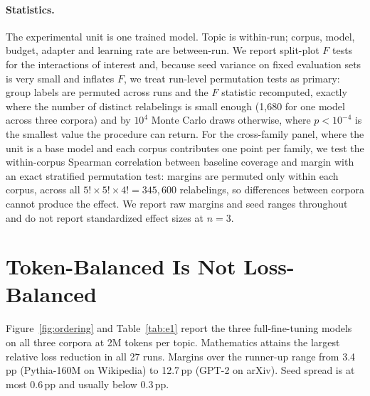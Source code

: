 \documentclass[11pt]{article}
\begin{document}
\paragraph{Statistics.}
The experimental unit is one trained model. Topic is within-run; corpus,
model, budget, adapter and learning rate are between-run. We report
split-plot $F$ tests for the interactions of interest and, because seed
variance on fixed evaluation sets is very small and inflates $F$, we treat
run-level permutation tests as primary: group labels are permuted across
runs and the $F$ statistic recomputed, exactly where the number of distinct
relabelings is small enough (1,680 for one model across three corpora) and
by $10^4$ Monte Carlo draws otherwise, where $p<10^{-4}$ is the smallest value
the procedure can return. For the cross-family panel, where the
unit is a base model and each corpus contributes one point per family, we
test the within-corpus Spearman correlation between baseline coverage and
margin with an exact stratified permutation test: margins are permuted only
within each corpus, across all $5!\times5!\times4!=345{,}600$ relabelings,
so differences between corpora cannot produce the effect. We report raw
margins and seed ranges throughout and do not report standardized effect
sizes at $n{=}3$.

\section{Token-Balanced Is Not Loss-Balanced}
\label{sec:main}

Figure~\ref{fig:ordering} and Table~\ref{tab:e1} report the three full-fine-tuning models on all three
corpora at 2M tokens per topic. Mathematics attains the largest relative
loss reduction in all 27 runs. Margins over the runner-up range from 3.4\,pp
(Pythia-160M on Wikipedia) to 12.7\,pp (GPT-2 on arXiv). Seed spread is at
most 0.6\,pp and usually below 0.3\,pp.
\end{document}
